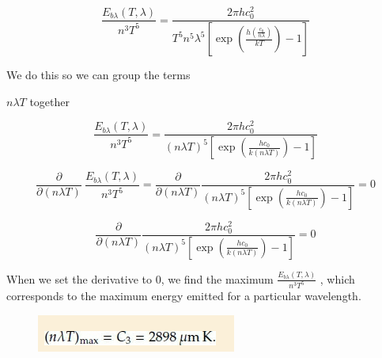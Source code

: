 \documentclass[12pt]{article}
\renewcommand{\_}{\kern-1.5pt\textunderscore\kern-1.5pt}
\begin{document}
\begin{itemize}

\par

 \[ \frac{E_{b \lambda } \left( T, \lambda  \right) }{n^{3}T^{5}}=\frac{2 \pi hc_{0}^{2}}{T^{5}n^{5} \lambda ^{5} \left[ \exp  \left( \frac{h \left( \frac{c_{0}}{n \lambda } \right) }{kT} \right) -1 \right] } \] \par

We do this so we can group the terms\par

 \( n \lambda T  \) together\par

 \[ \frac{E_{b \lambda } \left( T, \lambda  \right) }{n^{3}T^{5}}=\frac{2 \pi hc_{0}^{2}}{ \left( n \lambda T \right) ^{5} \left[ \exp  \left( \frac{hc_{0}}{k \left( n \lambda T \right) } \right) -1 \right] } \] \par


\vspace{\baselineskip}
 \[ \frac{ \partial }{ \partial  \left( n \lambda T \right) }~\frac{E_{b \lambda } \left( T, \lambda  \right) }{n^{3}T^{5}}=\frac{ \partial }{ \partial  \left( n \lambda T \right) }\frac{2 \pi hc_{0}^{2}}{ \left( n \lambda T \right) ^{5} \left[ \exp  \left( \frac{hc_{0}}{k \left( n \lambda T \right) } \right) -1 \right] }=0 \] \par

 \[ \frac{ \partial }{ \partial  \left( n \lambda T \right) }\frac{2 \pi hc_{0}^{2}}{ \left( n \lambda T \right) ^{5} \left[ \exp  \left( \frac{hc_{0}}{k \left( n \lambda T \right) } \right) -1 \right] }=0 \] \par

When we set the derivative to 0, we find the maximum  \( \frac{E_{b \lambda } \left( T, \lambda  \right) }{n^{3}T^{5}} \) , which corresponds to the maximum energy emitted for a particular wavelength.\par




\begin{figure}[H]
	\begin{Center}
		\includegraphics[width=2.58in,height=0.48in]{./media/image12.png}
	\end{Center}
\end{figure}



\end{itemize}
\end{document}
